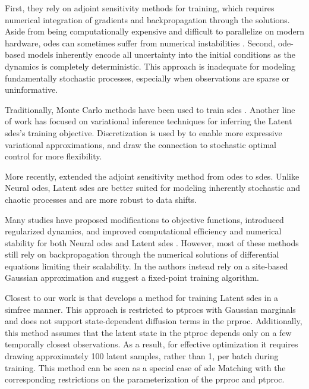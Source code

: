 \documentclass{article}
\theoremstyle{plain}
\theoremstyle{definition}
\theoremstyle{remark}
\begin{document}
First, they rely on adjoint sensitivity methods for training, which requires numerical integration of gradients and backpropagation through the solutions. Aside from being computationally expensive and difficult to parallelize on modern hardware, \glspl{ode} can sometimes suffer from numerical instabilities \cite{lea2000sensitivity}. Second, \gls{ode}-based models inherently encode all uncertainty into the initial conditions as the dynamics is completely deterministic. This approach is inadequate for modeling fundamentally stochastic processes, especially when observations are sparse or uninformative.


Traditionally, Monte Carlo methods have been used to train \glspl{sde} \citep{movellan2002monte,beskos2006exact,van2017bayesian}. Another line of work \cite{archambeau2007gaussian, archambeau2007variational} has focused on variational inference techniques for inferring the Latent \glspl{sde}'s training objective. Discretization is used by \citet{ryder2018black} to enable more expressive variational approximations, and \citet{ha2018adaptive} draw the connection to stochastic optimal control for more flexibility. 

More recently, \citet{li2020scalable} extended the adjoint sensitivity method from \glspl{ode} to \glspl{sde}. Unlike Neural \glspl{ode}, Latent \glspl{sde} are better suited for modeling inherently stochastic and chaotic processes and are more robust to data shifts.

Many studies have proposed modifications to objective functions, introduced regularized dynamics, and improved computational efficiency and numerical stability for both Neural \glspl{ode} \cite{kelly2020learning, finlay2020train, kidger2021hey} and Latent \glspl{sde} \cite{kidger2021efficient}. However, most of these methods still rely on backpropagation through the numerical solutions of differential equations limiting their scalability. In \citet{verma2024variational} the authors instead rely on a site-based Gaussian approximation and suggest a fixed-point training algorithm.

Closest to our work is \citet{course2024amortized} that develops a method for training Latent \glspl{sde} in a \gls{simfree} manner. This approach is restricted to \glspl{ptproc} with Gaussian marginals and does not support state-dependent diffusion terms in the \gls{prproc}. Additionally, this method assumes that the latent state in the \gls{ptproc} depends only on a few temporally closest observations. As a result, for effective optimization it requires drawing approximately 100 latent samples,  rather than 1, per batch during training. This method can be seen as a special case of \gls{sde} Matching with the corresponding restrictions on the parameterization of the \gls{prproc} and \gls{ptproc}.
\end{document}

